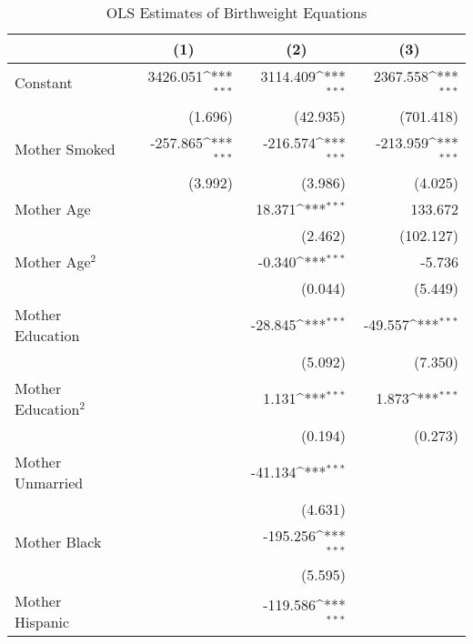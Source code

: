 \begin{table}[h!]\centering
\def\sym#1{\ifmmode^{#1}\else\(^{#1}\)\fi}
\caption{OLS Estimates of Birthweight Equations\label{reg:ols}}
\begin{tabular}{l*{3}{D{.}{.}{-1}}}
\toprule
                    &         &         &         \\
\midrule
Constant            &    3426.051\sym{***}&    3114.409\sym{***}&    2367.558\sym{***}\\
                    &     (1.696)         &    (42.935)         &   (701.418)         \\
Mother Smoked       &    -257.865\sym{***}&    -216.574\sym{***}&    -213.959\sym{***}\\
                    &     (3.992)         &     (3.986)         &     (4.025)         \\
Mother Age          &                     &      18.371\sym{***}&     133.672         \\
                    &                     &     (2.462)         &   (102.127)         \\
Mother Age$^2$      &                     &      -0.340\sym{***}&      -5.736         \\
                    &                     &     (0.044)         &     (5.449)         \\
Mother Education    &                     &     -28.845\sym{***}&     -49.557\sym{***}\\
                    &                     &     (5.092)         &     (7.350)         \\
Mother Education$^2$&                     &       1.131\sym{***}&       1.873\sym{***}\\
                    &                     &     (0.194)         &     (0.273)         \\
Mother Unmarried    &                     &     -41.134\sym{***}&                     \\
                    &                     &     (4.631)         &                     \\
Mother Black        &                     &    -195.256\sym{***}&                     \\
                    &                     &     (5.595)         &                     \\
Mother Hispanic     &                     &    -119.586\sym{***}&                     \\

\end{tabular}
\end{table}
